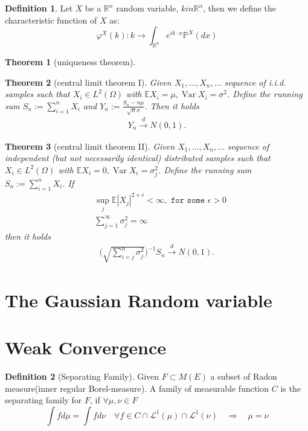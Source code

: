 \documentclass[a4paper,11pt]{book}
\newtheorem{theorem}{Theorem}[section]
\theoremstyle{definition}
\newtheorem{definition}{Definition}[section]
\theoremstyle{remark}
\DeclareMathOperator{\var}{Var}
\begin{document}
\begin{definition}
Let $X$ be a $\mathbb{R}^n$ random variable, $k in \mathbb{R}^n$, then we define the characteristic function of $X$ as:
	\begin{equation*}
		\varphi^X(k): k \rightarrow \int_{\mathbb{R}^n} e^{i k \cdot x} \mathbb{P}^X(dx)
	\end{equation*}
\end{definition}

\begin{theorem}[uniqueness theorem]
	
\end{theorem}

\begin{theorem}[central limit theorem I]
	Given $X_1, \dots, X_n, \dots$ sequence of i.i.d. samples such that $X_i \in L^2(\Omega)$ with $\mathbb{E}X_i= \mu, \var X_i = \sigma^2$. Define the running sum $S_n:= \sum_{i = 1}^n X_i$ and $Y_n:= \frac{S_n - n \mu}{\sqrt{n} \sigma}$. Then it holds
	\begin{align*}
		Y_n \overset{d}{\longrightarrow} N(0, 1). 
	\end{align*}
\end{theorem}

\begin{theorem}[central limit theorem II]
Given $X_1, \dots, X_n, \dots$ sequence of independent (but not necessarily identical) distributed samples such that $X_i \in L^2(\Omega)$ with $\mathbb{E}X_i= 0, \var X_i = \sigma^2_j$. Define the running sum $S_n:= \sum_{i = 1}^n X_i$. If
\begin{align*}
	&\sup_j \mathbb{E} |X_j|^{2 + \epsilon}< \infty, \texttt{ for some } \epsilon >0 \\
	&\sum_{j = 1}^\infty \sigma_j^2 = \infty 
\end{align*}
then it holds
\begin{align*}
	\bigg(\sqrt{\sum_{i = j}^n \sigma_j^2} \bigg)^{-1} S_n \overset{d}{\longrightarrow} N(0, 1).
\end{align*}
\end{theorem}

\section{The Gaussian Random variable}



\section{Weak Convergence}
\begin{definition}[Separating Family]
	Given $F \subset M(E)$ a subset of Radon measure(inner regular Borel-measure). A family of measurable function $C$ is the separating family for $F$, if $\forall \mu, \nu \in F$
	\begin{equation*}
		\int f d\mu = \int f d\nu \quad \forall f \in C \cap \mathcal{L}^1(\mu) \cap \mathcal{L}^1(\nu) \quad \Rightarrow \quad \mu = \nu
	\end{equation*}
\end{definition}
\end{document}
